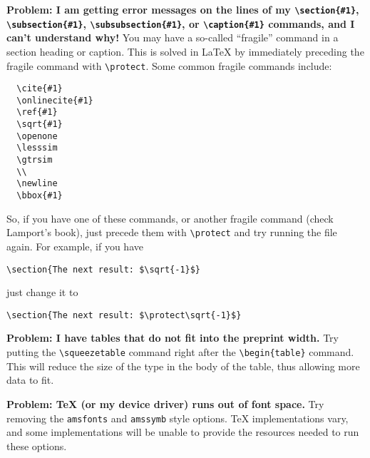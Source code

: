 {\bf Problem: I am getting error messages on the lines of my
\verb+\section{#1}+,
\verb+\subsection{#1}+,
\verb+\subsubsection{#1}+, or
\verb+\caption{#1}+ commands, and I can't understand why!}
You may have a so-called ``fragile'' command in a section heading or
caption. This is solved in \LaTeX{} by immediately preceding the fragile
command with \verb+\protect+. Some common fragile commands include:
\begin{verbatim}
  \cite{#1}
  \onlinecite{#1}
  \ref{#1}
  \sqrt{#1}
  \openone
  \lesssim
  \gtrsim
  \\
  \newline
  \bbox{#1}
\end{verbatim}
So, if you have one of these commands, or another fragile command (check
Lamport's book), just precede them with \verb+\protect+ and try running
the file again.
For example, if you have
\begin{verbatim}
\section{The next result: $\sqrt{-1}$}
\end{verbatim}
just change it to
\begin{verbatim}
\section{The next result: $\protect\sqrt{-1}$}
\end{verbatim}

{\bf Problem: I have tables that do not fit into the preprint width.} Try
putting the \verb+\squeezetable+ command right after the
\verb+\begin{table}+ command. This will reduce the size of the type in the
body of the table, thus allowing more data to fit.

{\bf Problem: \TeX{} (or my device driver) runs out of font space.} Try
removing the \verb+amsfonts+ and \verb+amssymb+ style options. \TeX{}
implementations vary, and some implementations will be unable to provide
the resources needed to run these options.

